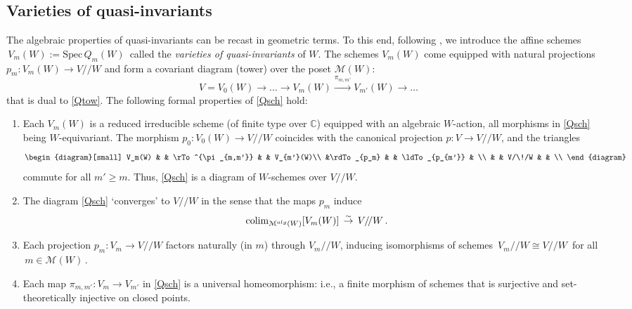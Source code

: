 \documentclass[11pt]{amsart}
\theoremstyle{definition}
\theoremstyle{remark}
\numberwithin{equation}{section}
\newcommand{\la}{\label}
\newcommand{\Spec}{\mathrm{Spec}}
\def\c{\mathbb{C}}
\def\M{\mathcal{M}}
\begin{document}
\subsection{Varieties of quasi-invariants}\la{varquasi}
\la{Varquasi}
The algebraic properties of quasi-invariants can be recast in geometric terms. To this end, following \cite{BEG03}, we introduce the affine schemes 
$\, V_m(W) := \Spec\,Q_m(W) \,$ called the {\it varieties of quasi-invariants} of $W$. The schemes $V_m(W)$ come equipped with natural projections $ p_m: V_m(W) \to V/\!/W$ and form a covariant diagram (tower) over the poset $\M(W) $:
%
\begin{equation}
\la{Qsch}
V =V_0(W) \to \ldots \to   V_m(W)  \xrightarrow{\pi_{m,m'}}  V_{m'}(W) \to \ldots 
\end{equation}
%
that is dual to \eqref{Qtow}. The following formal properties of \eqref{Qsch} hold:
%
\vspace{1ex}
%
\begin{enumerate}
  \item[(1)] Each $V_m(W) $ is a reduced irreducible scheme (of finite type over $\c$) equipped with an algebraic $W$-action, all morphisms in \eqref{Qsch} being $W$-equivariant. The morphism $ p_0: V_0(W) \to V/\!/W$  coincides with the canonical projection $ p: V \to V/\!/W $, and the  triangles 
%
\begin{equation*}
\la{Qtri}
\begin{diagram}[small] 
                V_m(W) & & \rTo^{\pi_{m,m'}} &           & V_{m'}(W)\\
                      &\rdTo_{p_m}  &               & \ldTo_{p_{m'}}     & \\
                     &        &        V/\!/W   &           & \\
               \end{diagram}  
\end{equation*}
%
commute for all $m' \ge m $. Thus, \eqref{Qsch} is a diagram of $W$-schemes over $V/\!/W$.\\

\item[(2)]
The diagram \eqref{Qsch} `converges' to $V/\!/W$ in the sense that the maps $p_m$ 
induce
%
\begin{equation*} 
\la{converge} 
\mathrm{colim}_{\M^{\rm alg}(W)}[V_m(W)]\, \stackrel{\sim}{\to}\, V/\!/W \, .
\end{equation*}
%

\item[(3)] Each projection $ p_m: V_m \to  V/\!/W $ factors naturally (in $m$) through $ V_m/\!/W $,
inducing isomorphisms of schemes $\,V_m/\!/W \cong V/\!/W \,$ for all  $\, m \in \M(W)\,$.\\
%

\item[(4)]
Each map $ \pi_{m,m'}: V_m \to V_{m'} $ in \eqref{Qsch} is a universal homeomorphism: i.e., a finite morphism of schemes that is surjective and set-theoretically injective on closed points. 
\end{enumerate}
%
\vspace{1ex}
\end{document}
